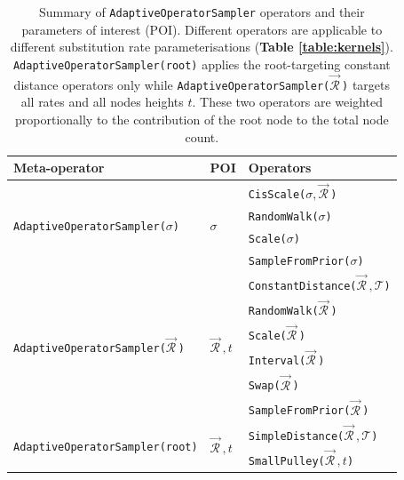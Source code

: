 \documentclass[10pt,letterpaper]{article}
\begin{document}
\begin{table}[h!]
\centering
\begin{tabular}{l l l} 
 Meta-operator & POI & Operators \\
\hline
 \multirow{4}{*}{\texttt{AdaptiveOperatorSampler($\sigma$)}} & \multirow{4}{*}{$\sigma$} & \texttt{CisScale($\sigma, \vec{\mathcal{R}}^{\,}$)} \\ 
 && \texttt{RandomWalk($\sigma$)}  \\
 && \texttt{Scale($\sigma$)}  \\
 && \texttt{SampleFromPrior($\sigma$)}  \\
 \hline
  \multirow{6}{*}{\texttt{AdaptiveOperatorSampler($\vec{\mathcal{R}}^{\,}$)}} & \multirow{6}{*}{$\vec{\mathcal{R}}^{\,}, t$} & \texttt{ConstantDistance($\vec{\mathcal{R}}^{\,}, \mathcal{T}$)}   \\ 
&& \texttt{RandomWalk($\vec{\mathcal{R}}^{\,}$)}  \\
&& \texttt{Scale($\vec{\mathcal{R}}^{\,}$)}   \\
&& \texttt{Interval($\vec{\mathcal{R}}^{\,}$)}   \\
&& \texttt{Swap($\vec{\mathcal{R}}^{\,}$)}  \\
&& \texttt{SampleFromPrior($\vec{\mathcal{R}}^{\,}$)} \\
 \hline
   \multirow{2}{*}{\texttt{AdaptiveOperatorSampler(root)}} & \multirow{2}{*}{$\vec{\mathcal{R}}^{\,}, t$} & \texttt{SimpleDistance($\vec{\mathcal{R}}^{\,}, \mathcal{T}$)}  \\ 
&&  \texttt{SmallPulley($\vec{\mathcal{R}}^{\,}, t$)}  \\
\end{tabular}
\caption{Summary of \texttt{AdaptiveOperatorSampler} operators and their parameters of interest (POI).
Different operators are applicable to different substitution rate parameterisations (\textbf{Table \ref{table:kernels}}). 
\texttt{AdaptiveOperatorSampler(root)} applies the root-targeting constant distance operators only \cite{zhang2020improving} while \texttt{AdaptiveOperatorSampler($\vec{\mathcal{R}}^{\,}$)} targets all rates and all nodes heights $t$. 
These two operators are weighted proportionally to the contribution of the root node to the total node count. }
\label{table:adaptiveSampling}
\end{table}



\end{document}
